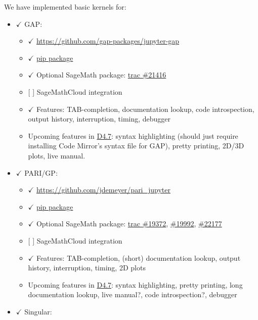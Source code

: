 We have implemented basic kernels for:

\begin{itemize}
\tightlist
\item
  \(\checkmark\) GAP:

  \begin{itemize}
  \tightlist
  \item
    \(\checkmark\) \url{https://github.com/gap-packages/jupyter-gap}
  \item
    \(\checkmark\)
    \href{https://pypi.python.org/pypi/jupyter-kernel-gap}{pip package}
  \item
    \(\checkmark\) Optional SageMath package:
    \href{https://trac.sagemath.org/ticket/21416}{trac \#21416}
  \item
    {[} {]} SageMathCloud integration
  \item
    \(\checkmark\) Features: TAB-completion, documentation lookup, code
    introspection, output history, interruption, timing, debugger
  \item
    Upcoming features in
    \href{https://github.com/OpenDreamKit/OpenDreamKit/issues/96}{D4.7}:
    syntax highlighting (should just require installing Code Mirror's
    syntax file for GAP), pretty printing, 2D/3D plots, live manual.
  \end{itemize}
\item
  \(\checkmark\) PARI/GP:

  \begin{itemize}
  \tightlist
  \item
    \(\checkmark\) \url{https://github.com/jdemeyer/pari_jupyter}
  \item
    \(\checkmark\) \href{https://pypi.python.org/pypi/pari_jupyter}{pip
    package}
  \item
    \(\checkmark\) Optional SageMath package:
    \href{https://trac.sagemath.org/ticket/19372}{trac \#19372},
    \href{https://trac.sagemath.org/ticket/19992}{\#19992},
    \href{https://trac.sagemath.org/ticket/22177}{\#22177}
  \item
    {[} {]} SageMathCloud integration
  \item
    \(\checkmark\) Features: TAB-completion, (short) documentation
    lookup, output history, interruption, timing, 2D plots
  \item
    Upcoming features in
    \href{https://github.com/OpenDreamKit/OpenDreamKit/issues/96}{D4.7}:
    syntax highlighting, pretty printing, long documentation lookup,
    live manual?, code introspection?, debugger
  \end{itemize}
\item
  \(\checkmark\) Singular:


\end{itemize}
